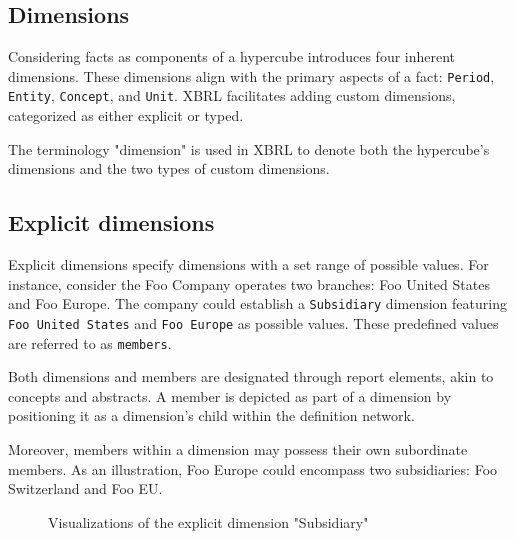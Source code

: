 \subsection{Dimensions}

Considering facts as components of a hypercube introduces four inherent dimensions.
These dimensions align with the primary aspects of a fact: \texttt{Period}, \texttt{Entity}, \texttt{Concept}, and \texttt{Unit}.
XBRL facilitates adding custom dimensions, categorized as either explicit or typed.

The terminology "dimension" is used in XBRL to denote both the hypercube's dimensions and the two types of custom dimensions.

\subsection{Explicit dimensions}

Explicit dimensions specify dimensions with a set range of possible values.
For instance, consider the Foo Company operates two branches: Foo United States and Foo Europe.
The company could establish a \texttt{Subsidiary} dimension featuring \texttt{Foo United States} and \texttt{Foo Europe} as possible values.
These predefined values are referred to as \texttt{members}.

Both dimensions and members are designated through report elements, akin to concepts and abstracts.
A member is depicted as part of a dimension by positioning it as a dimension's child within the definition network.

Moreover, members within a dimension may possess their own subordinate members.
As an illustration, Foo Europe could encompass two subsidiaries: Foo Switzerland and Foo EU.

\begin{figure}[H]
    \label{fig:example_explicit_dimension}
    \caption{Visualizations of the explicit dimension "Subsidiary"}
\end{figure}




